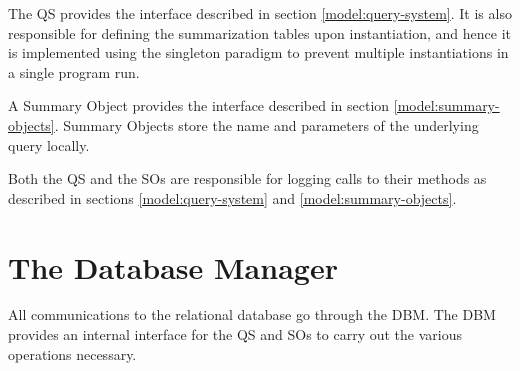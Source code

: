 The QS provides the interface described in section \ref{model:query-system}. It is also responsible for defining the summarization tables upon instantiation, and hence it is implemented using the singleton paradigm to prevent multiple instantiations in a single program run.

A Summary Object provides the interface described in section \ref{model:summary-objects}. Summary Objects store the name and parameters of the underlying query locally.

Both the QS and the SOs are responsible for logging calls to their methods as described in sections \ref{model:query-system} and \ref{model:summary-objects}.

\section{The Database Manager}

All communications to the relational database go through the DBM. The DBM provides an internal interface for the QS and SOs to carry out the various operations necessary.

